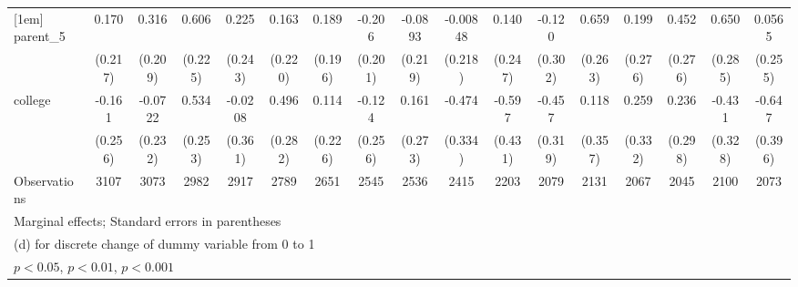{\begin{tabular}{l*{16}{c}}
[1em]
parent\_5            &       0.170         &       0.316         &       0.606\sym{**} &       0.225         &       0.163         &       0.189         &      -0.206         &     -0.0893         &    -0.00848         &       0.140         &      -0.120         &       0.659\sym{*}  &       0.199         &       0.452         &       0.650\sym{*}  &      0.0565         \\
                    &     (0.217)         &     (0.209)         &     (0.225)         &     (0.243)         &     (0.220)         &     (0.196)         &     (0.201)         &     (0.219)         &     (0.218)         &     (0.247)         &     (0.302)         &     (0.263)         &     (0.276)         &     (0.276)         &     (0.285)         &     (0.255)         \\
[1em]
college             &      -0.161         &     -0.0722         &       0.534\sym{*}  &     -0.0208         &       0.496         &       0.114         &      -0.124         &       0.161         &      -0.474         &      -0.597         &      -0.457         &       0.118         &       0.259         &       0.236         &      -0.431         &      -0.647         \\
                    &     (0.256)         &     (0.232)         &     (0.253)         &     (0.361)         &     (0.282)         &     (0.226)         &     (0.256)         &     (0.273)         &     (0.334)         &     (0.431)         &     (0.319)         &     (0.357)         &     (0.332)         &     (0.298)         &     (0.328)         &     (0.396)         \\
\hline
Observations        &        3107         &        3073         &        2982         &        2917         &        2789         &        2651         &        2545         &        2536         &        2415         &        2203         &        2079         &        2131         &        2067         &        2045         &        2100         &        2073         \\
\hline\hline
\multicolumn{17}{l}{\footnotesize Marginal effects; Standard errors in parentheses}\\
\multicolumn{17}{l}{\footnotesize  (d) for discrete change of dummy variable from 0 to 1}\\
\multicolumn{17}{l}{\footnotesize \sym{*} \(p<0.05\), \sym{**} \(p<0.01\), \sym{***} \(p<0.001\)}\\
\end{tabular}
}
